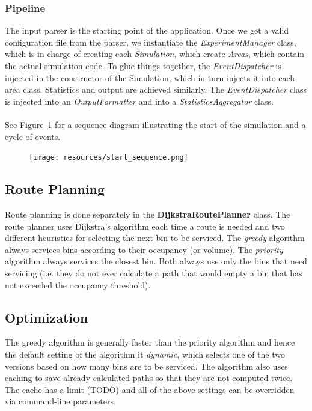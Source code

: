 \documentclass{article}
\begin{document}
		\subsubsection{Pipeline}
		The input parser is the starting point of the application. Once we get a valid configuration file from the parser, we instantiate the
		\textit{ExperimentManager} class, which is in charge of creating each \textit{Simulation}, which create \textit{Areas}, which contain the actual
		simulation code. To glue things together, the \textit{EventDispatcher} is injected in the constructor of the Simulation, which in turn 
		injects it into each area class. Statistics and output are achieved similarly. The \textit{EventDispatcher} class is injected into an
		\textit{OutputFormatter} and into a \textit{StatisticsAggregator} class.
			\\
			\\
			See Figure~\ref{fig:fig2} for a sequence diagram illustrating the start of the simulation and a cycle of events.

		\begin{figure}[H]
		\centering
			\texttt{[image: resources/start\_sequence.png]}
			\label{fig:fig2} 
		\end{figure}

	\subsection{Route Planning}
	Route planning is done separately in the \textbf{DijkstraRoutePlanner} class. The route planner uses Dijkstra's algorithm each time
	a route is needed and two different heuristics for selecting the next bin to be serviced. The \textit{greedy} algorithm always services
	bins according to their occupancy (or volume). The \textit{priority} algorithm always services the closest bin. Both always use only the bins
	that need servicing (i.e. they do not ever calculate a path that would empty a bin that has not exceeded the occupancy threshold).

	\subsection{Optimization} \label{optimization}
		The greedy algorithm is generally faster than the priority algorithm and hence the default setting of the algorithm it \textit{dynamic}, which
		selects one of the two versions based on how many bins are to be serviced. The algorithm also uses caching to save already calculated paths
		so that they are not computed twice. The cache has a limit (TODO) and all of the above settings can be overridden via command-line parameters.
		
\end{document}
